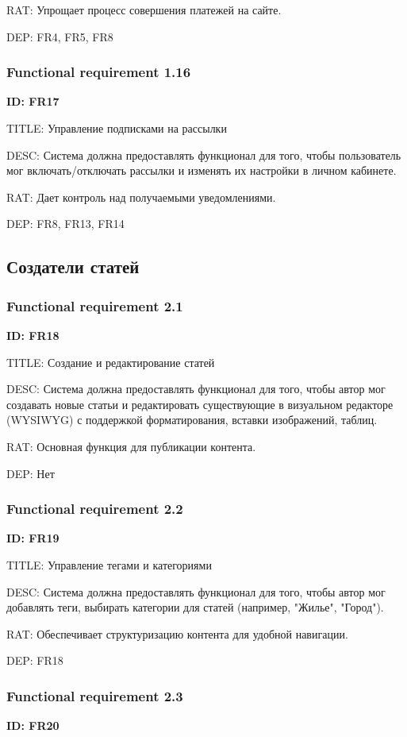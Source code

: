 \documentclass{scrreprt}
\begin{document}
RAT: Упрощает процесс совершения платежей на сайте.

DEP: FR4, FR5, FR8
\subsubsection{Functional requirement 1.16}
\textbf{ID: FR17}

TITLE: Управление подписками на рассылки

DESC: Система должна предоставлять функционал для того, чтобы пользователь мог включать/отключать рассылки и изменять их настройки в личном кабинете.

RAT: Дает контроль над получаемыми уведомлениями.

DEP: FR8, FR13, FR14

\subsection{Создатели статей}

\subsubsection{Functional requirement 2.1}
\textbf{ID: FR18}

TITLE: Создание и редактирование статей

DESC: Система должна предоставлять функционал для того, чтобы автор мог создавать новые статьи и редактировать существующие в визуальном редакторе (WYSIWYG) с поддержкой форматирования, вставки изображений, таблиц.

RAT: Основная функция для публикации контента.

DEP: Нет
\subsubsection{Functional requirement 2.2}
\textbf{ID: FR19}

TITLE: Управление тегами и категориями

DESC: Система должна предоставлять функционал для того, чтобы автор мог добавлять теги, выбирать категории для статей (например, "Жилье", "Город").

RAT: Обеспечивает структуризацию контента для удобной навигации.

DEP: FR18
\subsubsection{Functional requirement 2.3}
\textbf{ID: FR20}
\end{document}
